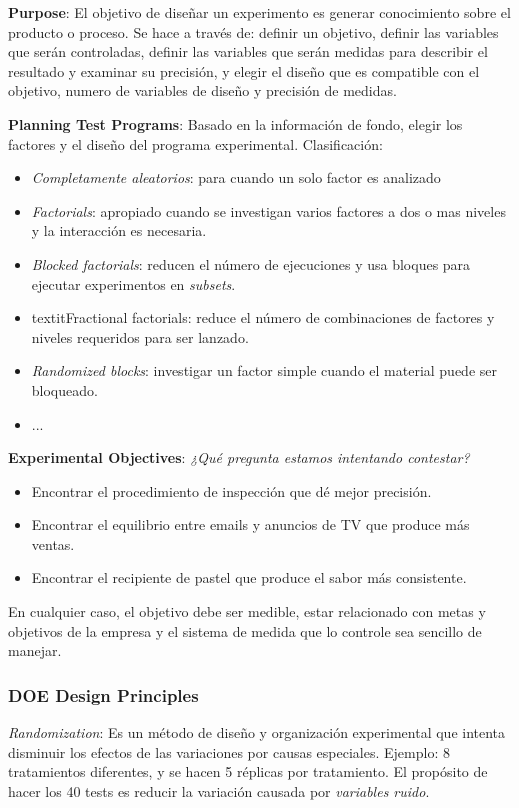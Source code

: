 \documentclass[]{article}
\begin{document}
\textbf{Purpose}: El objetivo de diseñar un experimento es generar conocimiento sobre el producto o proceso. Se hace a través de: definir un objetivo, definir las variables que serán controladas, definir las variables que serán medidas para describir el resultado y examinar su precisión, y elegir el diseño que es compatible con el objetivo, numero de variables de diseño y precisión de medidas.

\textbf{Planning Test Programs}: Basado en la información de fondo, elegir los factores y el diseño del programa experimental. Clasificación:
\begin{itemize}
	\item \textit{Completamente aleatorios}: para cuando un solo factor es analizado
	\item \textit{Factorials}: apropiado cuando se investigan varios factores a dos o mas niveles y la interacción es necesaria.
	\item \textit{Blocked factorials}: reducen el número de ejecuciones y usa bloques para ejecutar experimentos en \textit{subsets}.
	\item textit{Fractional factorials}: reduce el número de combinaciones de factores y niveles requeridos para ser lanzado.
	\item \textit{Randomized blocks}: investigar un factor simple cuando el material puede ser bloqueado.
	\item ...
\end{itemize}
 
\textbf{Experimental Objectives}: \textit{¿Qué pregunta estamos intentando contestar?} 
\begin{itemize}
	\item Encontrar el procedimiento de inspección que dé mejor precisión.
	\item Encontrar el equilibrio entre emails y anuncios de TV que produce más ventas.
	\item Encontrar el recipiente de pastel que produce el sabor más consistente.
\end{itemize}
En cualquier caso, el objetivo debe ser medible, estar relacionado con metas y objetivos de la empresa y el sistema de medida que lo controle sea sencillo de manejar.

\subsubsection{DOE Design Principles}

\textit{Randomization}: Es un método de diseño y organización experimental que intenta disminuir los efectos de las variaciones por causas especiales. Ejemplo: 8 tratamientos diferentes, y se hacen 5 réplicas por tratamiento. El propósito de hacer los 40 tests es reducir la variación causada por \textit{variables ruido}.
\end{document}
